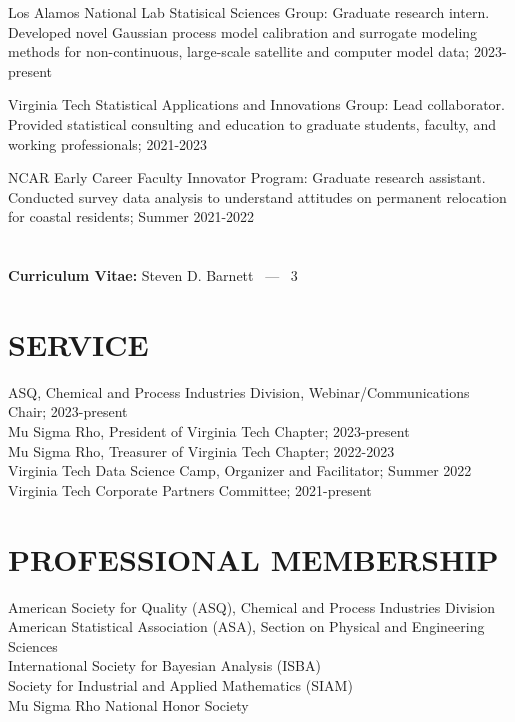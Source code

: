 \documentclass[margin,line]{res}
\begin{document}
\begin{resume}
{\sc Los Alamos National Lab Statisical Sciences Group}: Graduate research intern.  Developed novel Gaussian process model calibration and surrogate modeling methods for non-continuous, large-scale satellite and computer model data; 2023-present

{\sc Virginia Tech Statistical Applications and Innovations Group}: Lead collaborator.  Provided statistical consulting and education to graduate students, faculty, and working professionals; 2021-2023

{\sc NCAR Early Career Faculty Innovator Program}: Graduate research assistant.  Conducted survey data analysis to understand attitudes on permanent relocation for coastal residents; Summer 2021-2022

\pagebreak
\section{}
\hfill {\bf Curriculum Vitae:} Steven D. Barnett \  --- \  3

\section{\bf SERVICE}
ASQ, Chemical and Process Industries Division, Webinar/Communications Chair; 2023-present \\
Mu Sigma Rho, President of Virginia Tech Chapter; 2023-present \\
Mu Sigma Rho, Treasurer of Virginia Tech Chapter; 2022-2023 \\
Virginia Tech Data Science Camp, Organizer and Facilitator; Summer 2022 \\
Virginia Tech Corporate Partners Committee; 2021-present

\vspace{-0.2cm}
\medskip
\section{\bf PROFESSIONAL MEMBERSHIP}
American Society for Quality (ASQ), Chemical and Process Industries Division \\
American Statistical Association (ASA), Section on Physical and Engineering Sciences \\
International Society for Bayesian Analysis (ISBA) \\
Society for Industrial and Applied Mathematics (SIAM) \\
Mu Sigma Rho National Honor Society

\end{resume}
\end{document}
